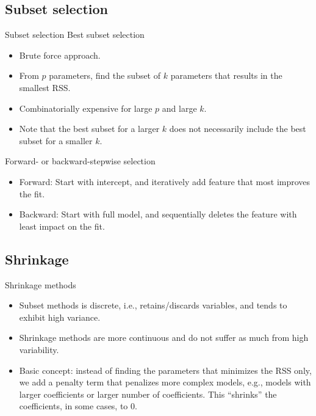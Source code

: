 \documentclass[aspectratio=169]{beamer}
\begin{document}
\subsection{Subset selection}

\begin{frame}{Subset selection}
    Best subset selection
    \begin{itemize}
        \item Brute force approach.
        \item From $p$ parameters, find the subset of $k$ parameters that results in the smallest RSS.
        \item Combinatorially expensive for large $p$ and large $k$.
        \item Note that the best subset for a larger $k$ does not necessarily include the best subset for a smaller $k$.
    \end{itemize}
    Forward- or backward-stepwise selection
    \begin{itemize}
        \item Forward: Start with intercept, and iteratively add feature that most improves the fit.
        \item Backward: Start with full model, and sequentially deletes the feature with least impact on the fit.
    \end{itemize}
\end{frame} 


\subsection{Shrinkage}

\begin{frame}{Shrinkage methods}
    \begin{itemize}
        \item Subset methods is discrete, i.e., retains/discards variables, and tends to exhibit high variance.
        \item Shrinkage methods are more continuous and do not suffer as much from high variability.
        \item Basic concept: instead of finding the parameters that minimizes the RSS only, we add a penalty term that penalizes more complex models, e.g., models with larger coefficients or larger number of coefficients. This ``shrinks'' the coefficients, in some cases, to 0.
    \end{itemize}
\end{frame}
\end{document}
